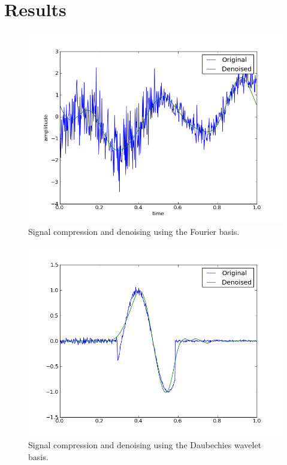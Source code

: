 \documentclass[10pt,conference,compsocconf]{IEEEtran}
\begin{document}
\section{Results}
\label{sec:results}


\begin{figure}[tbp]
  \centering
  \includegraphics[width=\columnwidth]{denoised_signal_1d}
  \caption{Signal compression and denoising using the Fourier basis.}
  \label{fig:denoise-fourier}
\end{figure}
\begin{figure}[htbp]
  \centering
  \includegraphics[width=\columnwidth]{local_wdenoised_1d}
  \caption{Signal compression and denoising using the Daubechies wavelet basis.}
  \label{fig:denoise-wavelet}
\end{figure}
\end{document}
